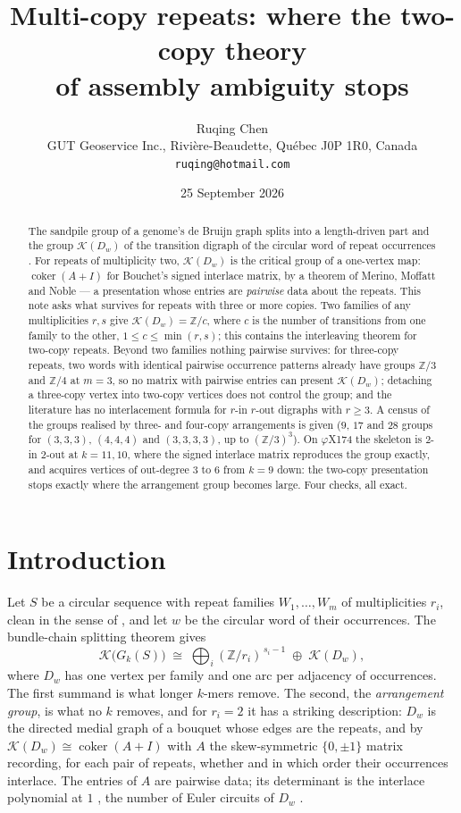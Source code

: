 \documentclass[11pt]{article}
\title{\bfseries Multi-copy repeats: where the two-copy theory\\ of assembly ambiguity stops}
\author{Ruqing Chen\\[2pt]
\normalsize GUT Geoservice Inc., Rivi\`ere-Beaudette, Qu\'ebec J0P 1R0, Canada\\
\normalsize\texttt{ruqing@hotmail.com}}
\date{25 September 2026}
\theoremstyle{plain}
\theoremstyle{definition}
\theoremstyle{remark}
\newcommand{\Z}{\mathbb{Z}}
\newcommand{\K}{\mathcal{K}}
\newcommand{\coker}{\operatorname{coker}}
\begin{document}
\maketitle

\begin{abstract}
\noindent
The sandpile group of a genome's de Bruijn graph splits into a length-driven part and
the group $\K(D_w)$ of the transition digraph of the circular word of repeat occurrences
\cite{Bio3}. For repeats of multiplicity two, $\K(D_w)$ is the critical group of a
one-vertex map: $\coker(A+I)$ for Bouchet's signed interlace matrix, by a theorem of
Merino, Moffatt and Noble --- a presentation whose entries are \emph{pairwise} data
about the repeats. This note asks what survives for repeats with three or more copies.
Two families of any multiplicities $r,s$ give $\K(D_w)=\Z/c$, where $c$ is the number of
transitions from one family to the other, $1\le c\le\min(r,s)$; this contains the
interleaving theorem for two-copy repeats. Beyond two families nothing pairwise survives:
for three-copy repeats, two words with identical pairwise occurrence patterns already
have groups $\Z/3$ and $\Z/4$ at $m=3$, so no matrix with pairwise entries can present
$\K(D_w)$; detaching a three-copy vertex into two-copy vertices does not control the
group; and the literature has no interlacement formula for $r$-in $r$-out digraphs with
$r\ge3$. A census of the groups realised by three- and four-copy arrangements is given
($9$, $17$ and $28$ groups for $(3,3,3)$, $(4,4,4)$ and $(3,3,3,3)$, up to $(\Z/3)^{3}$).
On $\varphi$X174 the skeleton is $2$-in $2$-out at $k=11,10$, where the signed interlace
matrix reproduces the group exactly, and acquires vertices of out-degree $3$ to $6$ from
$k=9$ down: the two-copy presentation stops exactly where the arrangement group becomes
large. Four checks, all exact.
\end{abstract}

\section{Introduction}\label{sec:intro}

Let $S$ be a circular sequence with repeat families $W_1,\dots,W_m$ of multiplicities
$r_i$, clean in the sense of \cite{Bio1}, and let $w$ be the circular word of their
occurrences. The bundle-chain splitting theorem \cite{Bio3} gives
\[
\K\bigl(G_k(S)\bigr)\;\cong\;\bigoplus_i(\Z/r_i)^{\,s_i-1}\;\oplus\;\K(D_w),
\]
where $D_w$ has one vertex per family and one arc per adjacency of occurrences. The
first summand is what longer $k$-mers remove. The second, the \emph{arrangement group},
is what no $k$ removes, and for $r_i=2$ it has a striking description: $D_w$ is the
directed medial graph of a bouquet whose edges are the repeats, and by
\cite[Thm.~7.3]{MMN} $\K(D_w)\cong\coker(A+I)$ with $A$ the skew-symmetric
$\{0,\pm1\}$ matrix recording, for each pair of repeats, whether and in which order
their occurrences interlace. The entries of $A$ are pairwise data; its determinant is the
interlace polynomial at $1$ \cite{ABS}, the number of Euler circuits of $D_w$
\cite{MacrisPule,Jonsson}.
\end{document}
